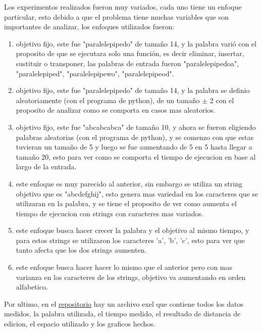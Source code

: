 Los experimentos realizados fueron muy variados, cada uno tiene un enfoque particular, esto debido a que el problema tiene muchas variables que son importantes de analizar, los enfoques utilizados fueron:

\begin{enumerate}[1]
    \item objetivo fijo, este fue "paralelepipedo" de tamaño 14, y la palabra varió con el proposito de que se ejecutara solo una función, es decir eliminar, insertar, sustituir o transponer, las palabras de entrada fueron "paralelepipedoa", "paralelepiped", "paralelepipewo", "paralelepipeod".
    \item objetivo fijo, este fue "paralelepipedo" de tamaño 14, y la palabra se definio aleatoriamente (con el programa de python), de un tamaño $\pm$ 2 con el proposito de analizar como se comporta en casos mas aleatorios.
    \item objetivo fijo, este fue "abcabcabca" de tamaño 10, y ahora se fueron eligiendo palabras aleatorias (con el programa de python), y se comenzo con que estas tuvieran un tamaño de 5 y luego se fue aumentando de 5 en 5 hasta llegar a tamaño 20, esto para ver como se comporta el tiempo de ejecucion en base al largo de la entrada.
    \item este enfoque es muy parecido al anterior, sin embargo se utiliza un string objetivo que es "abcdefghij", esto genera mas variedad en los caracteres que se utilizaran en la palabra, y se tiene el proposito de ver como aumenta el tiempo de ejecucion con strings con caracteres mas variados.
    \item este enfoque busca hacer crecer la palabra y el objetivo al mismo tiempo, y para estos strings se utilizaron los caracteres 'a', 'b', 'c', esto para ver que tanto afecta que los dos strings aumenten.
    \item este enfoque busca hacer hacer lo mismo que el anterior pero con mas varianza en los caracteres de los strings, objetivo va aumentando en orden alfabetico.
\end{enumerate}

Por ultimo, en el \href{https://github.com/Mappo1562/DistanciaMinimaDeEdicionExtendida}{repositorio} hay un archivo exel que contiene todos los datos medidos, la palabra utilizada, el tiempo medido, el resultado de distancia de edicion, el espacio utilizado y los graficos hechos.